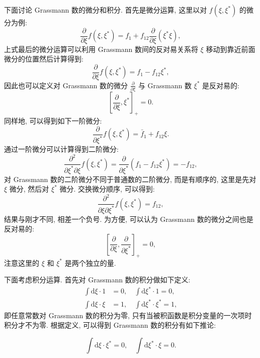 下面讨论 Grassmann 数的微分和积分. 首先是微分运算, 这里以对 $f\left(\xi, \xi^{*}\right)$ 的微分为例:
\begin{equation}
\frac{\partial}{\partial \xi} f\left(\xi, \xi^{*}\right)=f_{1}+f_{12} \frac{\partial}{\partial \xi}\left(\xi^{*}\xi\right),
\end{equation}
上式最后的微分运算可以利用 Grassmann 数间的反对易关系将 $\xi$ 移动到靠近前面微分的位置然后计算得到:
\begin{equation}
\frac{\partial}{\partial \xi} f\left(\xi, \xi^{*}\right)=f_{1}-f_{12} \xi^{*},
\end{equation}
因此也可以定义对 Grassmann 数的微分 $\displaystyle\frac{\partial}{\partial \xi}$ 与 Grassmann 数 $\xi^{*}$ 是反对易的:
\begin{equation}
\left[\frac{\partial}{\partial \xi}, \xi^{*}\right]_{+}=0.
\end{equation}
同样地, 可以得到如下一阶微分:
\begin{equation}
\frac{\partial}{\partial \xi^{*}} f\left(\xi, \xi^{*}\right)=\bar{f}_{1}+f_{12} \xi.
\end{equation}
通过一阶微分可以计算得到二阶微分:
\begin{equation}
\frac{\partial^{2}}{\partial \xi^{*} \partial \xi} f\left(\xi, \xi^{*}\right)=\frac{\partial}{\partial \xi^{*}}\left(f_{1}-f_{12} \xi^{*}\right)=-f_{12},
\end{equation}
对 Grassmann 数的二阶微分不同于普通数的二阶微分, 而是有顺序的, 这里是先对 $\xi$ 微分, 然后对 $\xi^{*}$ 微分. 交换微分顺序, 可以得到:
\begin{equation}
\frac{\partial^{2}}{\partial \xi \partial \xi^{*}} f\left(\xi, \xi^{*}\right)=f_{12},
\end{equation}
结果与刚才不同, 相差一个负号. 为方便, 可以认为 Grassmann 数的微分之间也是反对易的:
\begin{equation}
\left[\frac{\partial}{\partial \xi}, \frac{\partial}{\partial \xi^{*}}\right]_{+}=0,
\end{equation}
注意这里的 $\xi$ 和 $\xi^{*}$ 是两个独立的量.

下面考虑积分运算. 首先对 Grassmann 数的积分做如下定义:
\begin{align}
\int \mathrm{d} \xi \cdot 1&=0, \quad \int \mathrm{d} \xi^{*} \cdot 1=0,\nonumber\\
\int \mathrm{d} \xi \cdot \xi&=1, \quad \int \mathrm{d} \xi^{*} \cdot \xi^{*}=1,
\end{align}
即任意常数对 Grassmann 数的积分为零, 只有当被积函数是积分变量的一次项时积分才不为零. 根据定义, 可以得到 Grassmann 数的积分有如下推论:
\begin{corollary}{}{}
\begin{equation} 
\int \mathrm{d} \xi \cdot \xi^{*}=0, \quad \int \mathrm{d} \xi^{*} \cdot \xi=0.
\end{equation}
\end{corollary}

